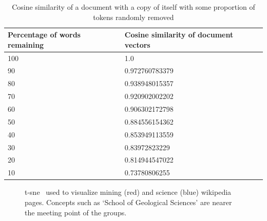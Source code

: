 \documentclass[11pt]{article}
\begin{document}
  \begin{table}[h]
    \begin{center}
      \begin{tabular}{l l}
      Percentage of words remaining & Cosine similarity of document vectors\\
      \hline
      100 & 1.0\\
      90 & 0.972760783379\\
      80 & 0.938948015357\\
      70 & 0.920902002202\\
      60 & 0.906302172798\\
      50 & 0.884556154362\\
      40 & 0.853949113559\\
      30 & 0.83972823229\\
      20 & 0.814944547022\\
      10 & 0.73780806255\\
      \end{tabular}
    \caption{Cosine similarity of a document with a copy of itself with
             some proportion of tokens randomly removed}
    \label{tab:remove}
    \end{center}
  \end{table}

  \begin{figure}[h]
    \begin{center}
    \end{center}
    \caption{t-sne~\cite{maaten2008visualizing} used to visualize
             mining (red) and science (blue) wikipedia pages.
             Concepts such as `School of Geological Sciences' are nearer
             the meeting point of the groups.}
    \label{fig:mvs}
  \end{figure}
\end{document}
